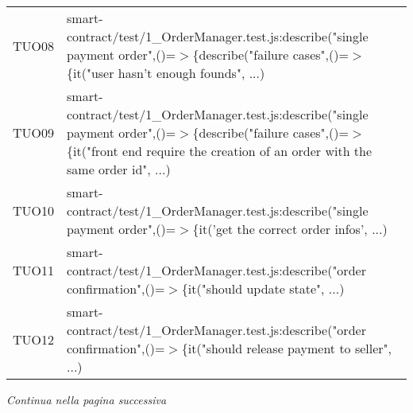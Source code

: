 \begin{table}[H]
\begin{tabular}{c|p{15cm}}
    TUO08 & smart-contract/test/1\_OrderManager.test.js:describe("single payment order",\newline()=$>$\{describe("failure cases",()=$>$\{it("user hasn't enough founds", ...)                                         \\
    TUO09 & smart-contract/test/1\_OrderManager.test.js:describe("single payment order",\newline()=$>$\{describe("failure cases",()=$>$\{it("front end require the creation of an order with the same order id", ...) \\
    TUO10 & smart-contract/test/1\_OrderManager.test.js:describe("single payment order",\newline()=$>$\{it('get the correct order infos', ...)                                                                        \\
    TUO11 & smart-contract/test/1\_OrderManager.test.js:describe("order confirmation",\newline()=$>$\{it("should update state", ...)                                                                                  \\
    TUO12 & smart-contract/test/1\_OrderManager.test.js:describe("order confirmation",\newline()=$>$\{it("should release payment to seller", ...)                                                                     \\
  \end{tabular}
\end{table}
\begin{center}
  \textit{\small Continua nella pagina successiva}
\end{center}

